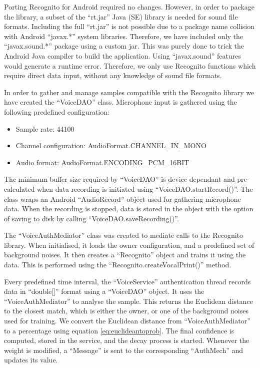 Porting Recognito for Android required no changes. However, in order to package the library, a subset of the ``rt.jar'' Java (SE) library is needed for sound file formats. Including the full ``rt.jar'' is not possible due to a package name collision with Android ``javax.*'' system libraries. Therefore, we have included only the ``javax.sound.*'' package using a custom jar. This was purely done to trick the Android Java compiler to build the application. Using ``javax.sound'' features would generate a runtime error. Therefore, we only use Recognito functions which require direct data input, without any knowledge of sound file formats.

In order to gather and manage samples compatible with the Recognito library we have created the ``VoiceDAO'' class. Microphone input is gathered using the following predefined configuration:
\begin{itemize}
	\item Sample rate: 44100
	\item Channel configuration: AudioFormat.CHANNEL\_IN\_MONO
	\item Audio format: AudioFormat.ENCODING\_PCM\_16BIT
\end{itemize}

The minimum buffer size required by ``VoiceDAO'' is device dependant and pre-calculated when data recording is initiated using ``VoiceDAO.startRecord()''. The class wraps an Android ``AudioRecord'' object used for gathering microphone data. When the recording is stopped, data is stored in the object with the option of saving to disk by calling ``VoiceDAO.saveRecording()''. 

The ``VoiceAuthMediator'' class was created to mediate calls to the Recognito library. When initialised, it loads the owner configuration, and a predefined set of background noises. It then creates a ``Recognito'' object and trains it using the data. This is performed using the ``Recognito.createVocalPrint()'' method.

Every predefined time interval, the ``VoiceService'' authentication thread records data in ``double[]'' format using a ``VoiceDAO'' object. It uses the ``VoiceAuthMediator'' to analyse the sample. This returns the Euclidean distance to the closest match, which is either the owner, or one of the background noises used for training. We convert the Euclidean distance from ``VoiceAuthMediator'' to a percentage using equation \ref{eq:euclideantoprob}. The final confidence is computed, stored in the service, and the decay process is started. Whenever the weight is modified, a ``Message'' is sent to the corresponding ``AuthMech'' and updates its value. 
 
